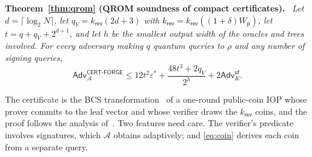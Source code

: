 \documentclass[10pt,journal,compsoc]{IEEEtran}
\theoremstyle{tplain}
\theoremstyle{tdef}
\theoremstyle{remark}
\newcommand{\Adv}{\mathsf{Adv}}
\newcommand{\Wp}{W_{\mathsf{p}}}
\newcommand{\kr}{k_{\mathsf{rev}}}
\newcommand{\RO}{\rho}
\newenvironment{restate}[1]{\par\smallskip\noindent\textbf{#1.}\ \itshape\ignorespaces}{\par\smallskip}
\begin{document}
\begin{restate}{Theorem~\ref{thm:qrom} (QROM soundness of compact certificates)}
Let $d=\lceil\log_2N\rceil$, let $q_V=\kr(2d+3)$ with $\kr=\kr((1+\delta)\Wp)$, let $t=q+q_V+2^{d+1}$, and let $h$ be the smallest output width of the oracles and trees involved. For every adversary making $q$ quantum queries to $\RO$ and any number of signing queries,
\[
\Adv^{\mathsf{CERT\text{-}FORGE}}_{\mathcal A}\le 12t^2\varepsilon^\ast+\frac{48t^3+2q_V}{2^{h}}+2\Adv^{\mathsf{uf}}_{K}.
\]
\end{restate}

\noindent The certificate is the BCS transformation~\cite{bcs2016} of a one-round public-coin IOP whose prover commits to the leaf vector and whose verifier draws the $\kr$ coins, and the proof follows the analysis of~\cite[Sec.~2.9]{chiesa2019qrom}. Two features need care. The verifier's predicate involves signatures, which $\mathcal A$ obtains adaptively; and \cref{eq:coin} derives each coin from a separate query.
\end{document}
